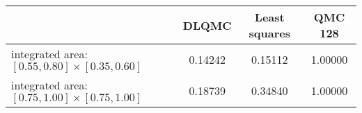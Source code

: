 \begin{tabular}{|l|c|c|c|}
\hline
 &DLQMC&Least squares&QMC 128\\ 
\hline

integrated area: $[0.55,0.80]\times [0.35,0.60]$ & 0.14242 & 0.15112 & 1.00000\\ 
\hline
integrated area: $[0.75,1.00]\times [0.75,1.00]$ & 0.18739 & 0.34840 & 1.00000\\ 
\hline
\end{tabular}

